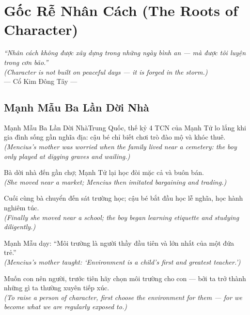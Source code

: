 \chapter{Gốc Rễ Nhân Cách (The Roots of Character)}
\begin{center}
  \textit{\color{truyengold}``Nhân cách không được xây dựng trong những ngày bình an --- mà được tôi luyện trong cơn bão.''}\\[4pt]
  \textit{(Character is not built on peaceful days --- it is forged in the storm.)}\\[4pt]
  \small\color{truyenblue}--- Cổ Kim Đông Tây ---
\end{center}
\ngancach

\section{Mạnh Mẫu Ba Lần Dời Nhà}
\begin{truyen}{Mạnh Mẫu Ba Lần Dời Nhà}{Trung Quốc, thế kỷ 4 TCN}
 của Mạnh Tử lo lắng khi gia đình sống gần nghĩa địa: cậu bé chỉ biết chơi trò đào mộ và khóc thuê.\\[4pt]
\textit{(Mencius's mother was worried when the family lived near a cemetery: the boy only played at digging graves and wailing.)}

Bà dời nhà đến gần chợ; Mạnh Tử lại học đòi mặc cả và buôn bán.\\[4pt]
\textit{(She moved near a market; Mencius then imitated bargaining and trading.)}

Cuối cùng bà chuyển đến sát trường học; cậu bé bắt đầu học lễ nghĩa, học hành nghiêm túc.\\[4pt]
\textit{(Finally she moved near a school; the boy began learning etiquette and studying diligently.)}

Mạnh Mẫu dạy: ``Môi trường là người thầy đầu tiên và lớn nhất của một đứa trẻ.''\\[4pt]
\textit{(Mencius's mother taught: `Environment is a child's first and greatest teacher.')}

\end{truyen}
\begin{baihoc}
  Muốn con nên người, trước tiên hãy chọn môi trường cho con --- bởi ta trở thành những gì ta thường xuyên tiếp xúc.\\[4pt]
  \textit{(To raise a person of character, first choose the environment for them --- for we become what we are regularly exposed to.)}
\end{baihoc}


